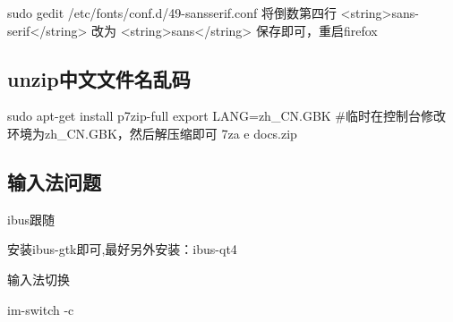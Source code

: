 \begin{shellcmd}
sudo gedit /etc/fonts/conf.d/49-sansserif.conf 
将倒数第四行 <string>sans-serif</string>
改为 <string>sans</string>
保存即可，重启firefox
\end{shellcmd}

\subsection{unzip中文文件名乱码}
\begin{shellcmd}
sudo apt-get install p7zip-full
export LANG=zh_CN.GBK  #临时在控制台修改环境为zh_CN.GBK，然后解压缩即可
7za e docs.zip
\end{shellcmd}

\subsection{输入法问题}
ibus跟随
\begin{shellcmd}
安装ibus-gtk即可,最好另外安装：ibus-qt4
\end{shellcmd}
输入法切换
\begin{shellcmd}
im-switch -c
\end{shellcmd}









